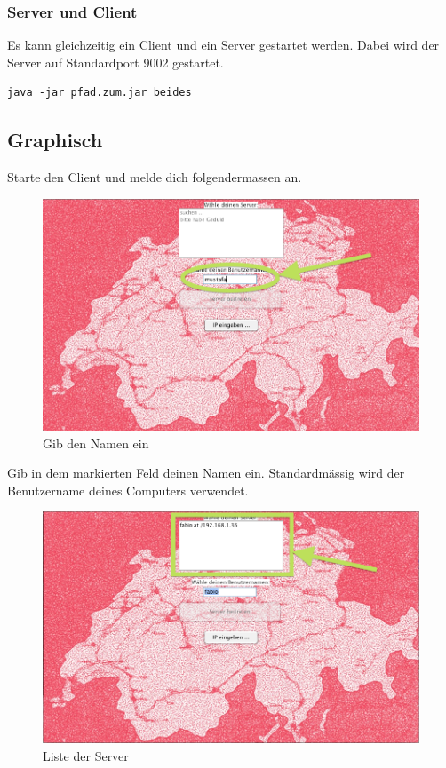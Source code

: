 \documentclass[ngerman, 12pt, pdftex]{scrartcl}[2006/07/30]
\begin{document}
\subsubsection{Server und Client}
Es kann gleichzeitig ein Client und ein Server gestartet werden.
Dabei wird der Server auf Standardport 9002 gestartet.
\begin{lstlisting}
java -jar pfad.zum.jar beides
\end{lstlisting}

\newpage

\subsection{Graphisch}
Starte den Client und melde dich folgendermassen an.

\begin{figure}[h]
\centering
\includegraphics[scale=0.3]{starten/namen_eingeben.png}
\caption{Gib den Namen ein}
\end{figure}

Gib in dem markierten Feld deinen Namen ein. Standardm\"{a}ssig wird der Benutzername deines Computers verwendet.


\begin{figure}[h]
\centering
\includegraphics[scale=0.3]{starten/serverliste.png}
\caption{Liste der Server}
\end{figure}
\end{document}
